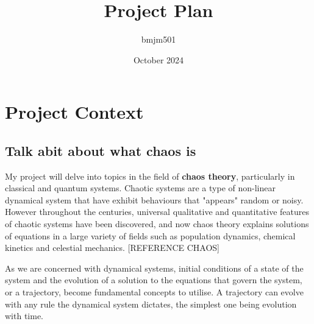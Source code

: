\documentclass[12pt,a4paper]{amsart}
\title{Project Plan}
\author{bmjm501 }
\date{October 2024}
\begin{document}
\maketitle









\section{Project Context}

\subsection{Talk abit about what chaos is}
My project will delve into topics in the field of \textbf{chaos theory}, particularly in classical and quantum systems. Chaotic systems are a type of non-linear dynamical system that have exhibit behaviours that "appears" random or noisy. However throughout the centuries, universal qualitative and quantitative features of chaotic systems have been discovered, and now chaos theory explains solutions of equations in a large variety of fields such as population dynamics, chemical kinetics and celestial mechanics. [REFERENCE CHAOS] 

As we are concerned with dynamical systems, initial conditions of a state of the system and the evolution of a solution to the equations that govern the system, or a trajectory, become fundamental concepts to utilise. A trajectory can evolve with any rule the dynamical system dictates, the simplest one being evolution with time.
\end{document}
